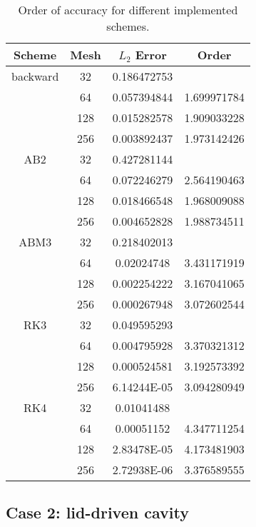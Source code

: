 \documentclass{article}
\begin{document}
\begin{table}
  \caption{Order of accuracy for different implemented schemes.}
  \centering
  \begin{tabular}{cccc}
    \toprule
    Scheme   & Mesh & $L_2$ Error & Order       \\
    \midrule
    backward & 32   & 0.186472753 &             \\
             & 64   & 0.057394844 & 1.699971784 \\
             & 128  & 0.015282578 & 1.909033228 \\
             & 256  & 0.003892437 & 1.973142426 \\
    \midrule
    AB2      & 32   & 0.427281144 &             \\
             & 64   & 0.072246279 & 2.564190463 \\
             & 128  & 0.018466548 & 1.968009088 \\
             & 256  & 0.004652828 & 1.988734511 \\
    \midrule
    ABM3     & 32   & 0.218402013 &             \\
             & 64   & 0.02024748  & 3.431171919 \\
             & 128  & 0.002254222 & 3.167041065 \\
             & 256  & 0.000267948 & 3.072602544 \\
    \midrule
    RK3      & 32   & 0.049595293 &             \\
             & 64   & 0.004795928 & 3.370321312 \\
             & 128  & 0.000524581 & 3.192573392 \\
             & 256  & 6.14244E-05 & 3.094280949 \\
    \midrule
    RK4      & 32   & 0.01041488  &             \\
             & 64   & 0.00051152  & 4.347711254 \\
             & 128  & 2.83478E-05 & 4.173481903 \\
             & 256  & 2.72938E-06 & 3.376589555 \\
    \bottomrule
    \end{tabular}
  \label{tab:order}
\end{table}


\subsection{Case 2: lid-driven cavity}
\end{document}
